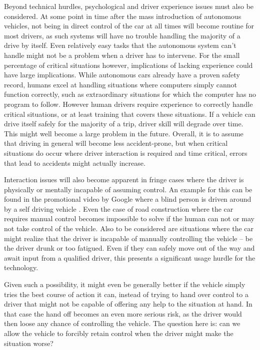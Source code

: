 \documentclass{acm_proc_article-sp}
\begin{document}
Beyond technical hurdles, psychological and driver experience issues must also be considered.
At some point in time after the mass introduction of autonomous vehicles, not being in direct control of the car at all times will become routine for most drivers, as such systems will have no trouble handling the majority of a drive by itself.
Even relatively easy tasks that the autonomous system can't handle might not be a problem when a driver has to intervene.
For the small percentage of critical situations however, implications of lacking experience could have large implications.
While autonomous cars already have a proven safety record, humans excel at handling situations where computers simply cannot function correctly, such as extraordinary situations for which the computer has no program to follow.
However human drivers require experience to correctly handle critical situations, or at least training that covers these situations.
If a vehicle can drive itself safely for the majority of a trip, driver skill will degrade over time.
This might well become a large problem in the future.
Overall, it is to assume that driving in general will become less accident-prone, but when critical situations do occur where driver interaction is required and time critical, errors that lead to accidents might actually increase.

Interaction issues will also become apparent in fringe cases where the driver is physically or mentally incapable of assuming control.
An example for this can be found in the promotional video by Google where a blind person is driven around by a self driving vehicle \cite{www:google_blind}.
Even the case of road construction where the car requires manual control becomes impossible to solve if the human can not or may not take control of the vehicle.
Also to be considered are situations where the car might realize that the driver is incapable of manually controlling the vehicle – be the driver drunk or too fatigued.
Even if they can safely move out of the way and await input from a qualified driver, this presents a significant usage hurdle for the technology.

Given such a possibility, it might even be generally better if the vehicle simply tries the best course of action it can, instead of trying to hand over control to a driver that might not be capable of offering any help to the situation at hand.
In that case the hand off becomes an even more serious risk, as the driver would then loose any chance of controlling the vehicle.
The question here is: can we allow the vehicle to forcibly retain control when the driver might make the situation worse?
\end{document}
